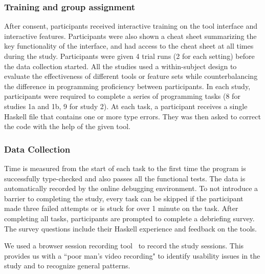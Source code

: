 \subsubsection*{\textbf{Training and group assignment}}
After consent, participants received interactive training on the tool interface and interactive features. Participants were also shown a cheat sheet summarizing the key functionality of the interface, and had access to the cheat sheet at all times during the study. Participants were given 4 trial runs (2 for each setting) before the data collection started. 
All the studies used a within-subject design to evaluate the effectiveness of different tools or feature sets while counterbalancing the difference in programming proficiency between participants. In each study, participants were required to complete a series of programming tasks (8 for studies 1a and 1b, 9 for study 2). At each task, a participant receives a single Haskell file that contains one or more type errors. They was then asked to correct the code with the help of the given tool.


\subsubsection*{\textbf{Data Collection}}
Time is measured from the start of each task to the first time the program is successfully type-checked and also passes all the functional tests. The data is automatically recorded by the online debugging environment. To not introduce a barrier to completing the study, every task can be skipped if the participant made three failed attempts or is stuck for over 1 minute on the task.
After completing all tasks, participants are prompted to complete a debriefing survey. The survey questions include their Haskell experience and feedback on the tools.

We used a browser session recording tool~\cite{openreplay_openreplay_2022} to record the study sessions. This provides us with a ``poor man's video recording" to identify usability issues in the study and to recognize general patterns. 


